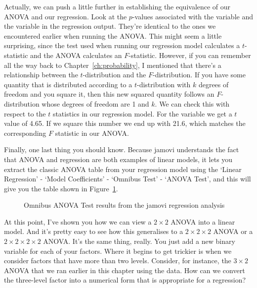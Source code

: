 Actually, we can push a little further in establishing the equivalence of our ANOVA and our regression. Look at the $p$-values associated with the  variable and the  variable in the regression output. They're identical to the ones we encountered earlier when running the ANOVA. This might seem a little surprising, since the test used when running our regression model calculates a $t$-statistic and the ANOVA calculates an $F$-statistic. However, if you can remember all the way back to Chapter~\ref{ch:probability}, I mentioned that there's a relationship between the $t$-distribution and the $F$-distribution. If you have some quantity that is distributed according to a $t$-distribution with $k$ degrees of freedom and you square it, then this new squared quantity follows an $F$-distribution whose degrees of freedom are 1 and $k$. We can check this with respect to the $t$ statistics in our regression model. For the  variable we get a $t$ value of 4.65. If we square this number we end up with 21.6, which matches the corresponding $F$ statistic in our ANOVA. 

Finally, one last thing you should know. Because jamovi understands the fact that ANOVA and regression are both examples of linear models, it lets you extract the classic ANOVA table from your regression model using the `Linear Regression' - `Model Coefficients' - `Omnibus Test' - `ANOVA Test', and this will give you the table shown in Figure~\ref{fig:factorialanova8}.

\begin{figure}[!htb]
\begin{center}
\caption{Omnibus ANOVA Test results from the jamovi regression analysis}
\label{fig:factorialanova8}
\HR
\end{center}
\end{figure}


At this point, I've shown you how we can view a $2\times 2$ ANOVA into a linear model. And it's pretty easy to see how this generalises to a $2 \times 2 \times 2$ ANOVA or a $2 \times 2 \times 2 \times 2$ ANOVA. It's the same thing, really. You just add a new binary variable for each of your factors. Where it begins to get trickier is when we consider factors that have more than two levels. Consider, for instance, the $3 \times 2$ ANOVA that we ran earlier in this chapter using the  data. How can we convert the three-level  factor into a numerical form that is appropriate for a regression?


